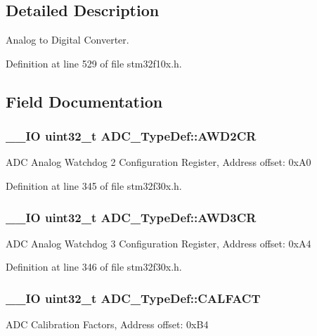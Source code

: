 \subsection{Detailed Description}
Analog to Digital Converter. 

Definition at line 529 of file stm32f10x.\-h.



\subsection{Field Documentation}
\hypertarget{struct_a_d_c___type_def_a02a34c693903ef6ac7326ed02582fdcf}{
\subsubsection[{A\-W\-D2\-C\-R}]{\setlength{\rightskip}{0pt plus 5cm}\-\_\-\-\_\-\-I\-O {\bf uint32\-\_\-t} A\-D\-C\-\_\-\-Type\-Def\-::\-A\-W\-D2\-C\-R}}\label{struct_a_d_c___type_def_a02a34c693903ef6ac7326ed02582fdcf}
A\-D\-C Analog Watchdog 2 Configuration Register, Address offset\-: 0x\-A0 

Definition at line 345 of file stm32f30x.\-h.

\hypertarget{struct_a_d_c___type_def_a3be9b42a9cf52d1b6776c2cfa439592f}{
\subsubsection[{A\-W\-D3\-C\-R}]{\setlength{\rightskip}{0pt plus 5cm}\-\_\-\-\_\-\-I\-O {\bf uint32\-\_\-t} A\-D\-C\-\_\-\-Type\-Def\-::\-A\-W\-D3\-C\-R}}\label{struct_a_d_c___type_def_a3be9b42a9cf52d1b6776c2cfa439592f}
A\-D\-C Analog Watchdog 3 Configuration Register, Address offset\-: 0x\-A4 

Definition at line 346 of file stm32f30x.\-h.

\hypertarget{struct_a_d_c___type_def_a685111833b5ed05fa8199fcac1f404b6}{
\subsubsection[{C\-A\-L\-F\-A\-C\-T}]{\setlength{\rightskip}{0pt plus 5cm}\-\_\-\-\_\-\-I\-O {\bf uint32\-\_\-t} A\-D\-C\-\_\-\-Type\-Def\-::\-C\-A\-L\-F\-A\-C\-T}}\label{struct_a_d_c___type_def_a685111833b5ed05fa8199fcac1f404b6}
A\-D\-C Calibration Factors, Address offset\-: 0x\-B4 

